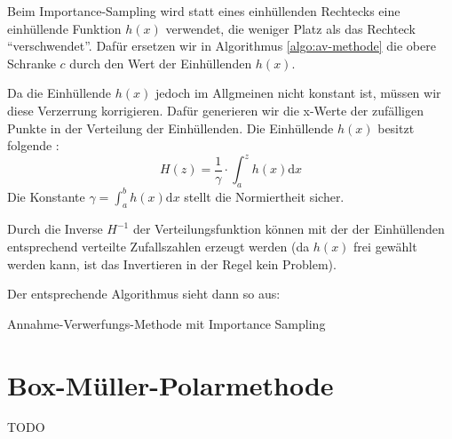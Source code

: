 Beim Importance-Sampling wird statt eines einhüllenden Rechtecks eine einhüllende
Funktion $h(x)$ verwendet, die weniger Platz als das Rechteck "`verschwendet"'.
Dafür ersetzen wir in Algorithmus \ref{algo:av-methode} die obere Schranke $c$
durch den Wert der Einhüllenden $h(x)$.

Da die Einhüllende $h(x)$ jedoch im Allgmeinen nicht konstant ist, müssen wir
diese Verzerrung korrigieren. Dafür generieren wir die x-Werte der zufälligen
Punkte in der Verteilung der Einhüllenden. Die Einhüllende $h(x)$ besitzt
folgende :
\[H(z) = \frac{1}{\gamma}\cdot\int_a^z h(x) \mathrm{d}x\]
Die Konstante $\gamma = \int_a^b h(x)\mathrm{d}x$ stellt die Normiertheit sicher.

Durch die Inverse $H^{-1}$ der Verteilungsfunktion können mit der
 der Einhüllenden entsprechend
verteilte Zufallszahlen erzeugt werden (da $h(x)$ frei gewählt werden kann, ist
das Invertieren in der Regel kein Problem).

Der entsprechende Algorithmus sieht dann so aus:

\begin{algorithm}[h!]
\DontPrintSemicolon
\LinesNumbered


\caption{Annahme-Verwerfungs-Methode mit Importance Sampling}\label{algo:av-methode-is}
\end{algorithm}

\section{Box-Müller-Polarmethode}

TODO
